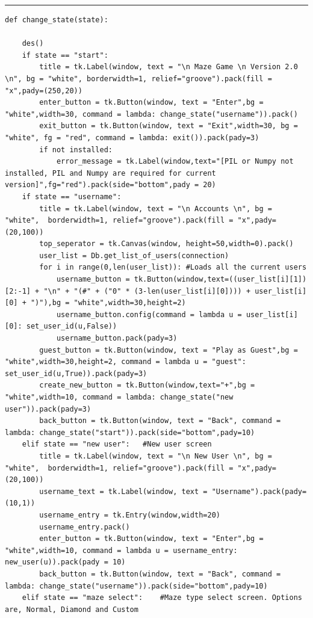 \documentclass{article}
\begin{document}
\textcolor[RGB]{220,220,220}{\rule{\linewidth}{0.2pt}}
\begin{lstlisting}
def change_state(state):      

    des()
    if state == "start":    
        title = tk.Label(window, text = "\n Maze Game \n Version 2.0 \n", bg = "white", borderwidth=1, relief="groove").pack(fill = "x",pady=(250,20))
        enter_button = tk.Button(window, text = "Enter",bg = "white",width=30, command = lambda: change_state("username")).pack()
        exit_button = tk.Button(window, text = "Exit",width=30, bg = "white", fg = "red", command = lambda: exit()).pack(pady=3)
        if not installed:
            error_message = tk.Label(window,text="[PIL or Numpy not installed, PIL and Numpy are required for current version]",fg="red").pack(side="bottom",pady = 20)
    if state == "username": 
        title = tk.Label(window, text = "\n Accounts \n", bg = "white",  borderwidth=1, relief="groove").pack(fill = "x",pady=(20,100))
        top_seperator = tk.Canvas(window, height=50,width=0).pack()
        user_list = Db.get_list_of_users(connection)
        for i in range(0,len(user_list)): #Loads all the current users
            username_button = tk.Button(window,text=((user_list[i][1])[2:-1] + "\n" + "(#" + ("0" * (3-len(user_list[i][0]))) + user_list[i][0] + ")"),bg = "white",width=30,height=2)
            username_button.config(command = lambda u = user_list[i][0]: set_user_id(u,False))
            username_button.pack(pady=3)
        guest_button = tk.Button(window, text = "Play as Guest",bg = "white",width=30,height=2, command = lambda u = "guest": set_user_id(u,True)).pack(pady=3)
        create_new_button = tk.Button(window,text="+",bg = "white",width=10, command = lambda: change_state("new user")).pack(pady=3)
        back_button = tk.Button(window, text = "Back", command = lambda: change_state("start")).pack(side="bottom",pady=10)  
    elif state == "new user":   #New user screen
        title = tk.Label(window, text = "\n New User \n", bg = "white",  borderwidth=1, relief="groove").pack(fill = "x",pady=(20,100))
        username_text = tk.Label(window, text = "Username").pack(pady=(10,1))
        username_entry = tk.Entry(window,width=20)
        username_entry.pack()
        enter_button = tk.Button(window, text = "Enter",bg = "white",width=10, command = lambda u = username_entry: new_user(u)).pack(pady = 10)
        back_button = tk.Button(window, text = "Back", command = lambda: change_state("username")).pack(side="bottom",pady=10)  
    elif state == "maze select":    #Maze type select screen. Options are, Normal, Diamond and Custom

\end{lstlisting}
\end{document}
